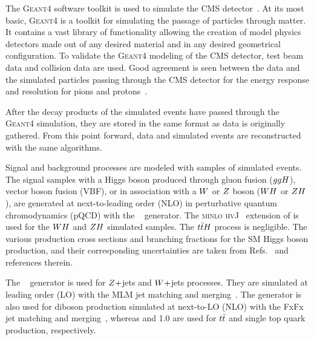 The \textsc{Geant4} software toolkit is used to simulate the CMS 
detector~\cite{Agostinelli:2002hh}. At its most basic, \textsc{Geant4} is a 
toolkit for simulating the passage of particles through matter. It contains a 
vast library of functionality allowing the creation of model physics detectors
made out of any desired material and in any desired geometrical configuration.
To validate the \textsc{Geant4} modeling of the CMS detector, test beam data and
collision data are used. Good agreement is seen between the data and the
simulated particles passing through the CMS detector for the energy response
and resolution for pions and protons~\cite{geant4_cms_2017}.

After the decay products of the simulated events have passed through the \textsc{Geant4}
simulation, they are stored in the same format as data is originally gathered. From
this point forward, data and simulated events are reconstructed with the same 
algorithms.




Signal and background processes are modeled with samples of simulated events.
The signal samples with a Higgs boson produced through gluon fusion ($ggH$), vector boson fusion (VBF),
or in association with a $W$ or $Z$ boson ($WH$ or $ZH$), are generated at next-to-leading order (NLO) in perturbative quantum chromodynamics (pQCD) with the ~\cite{Nason:2004rx,Frixione:2007vw, Alioli:2010xd, Alioli:2010xa, Alioli:2008tz} generator. The \textsc{minlo hvJ}~\cite{Luisoni:2013kna} extension of  is used for the $WH$ and $ZH$ simulated samples. 
The $t\bar{t}H$ process is negligible.
The various production cross sections and branching fractions for the SM Higgs boson production, and their corresponding uncertainties are taken from Refs.~\cite{deFlorian:2016spz,Denner:2011mq,Ball:2011mu} and references therein.

The \aMCATNLO~\cite{Alwall:2014hca} generator is used for $Z+$jets and $W+$jets processes. They are simulated at leading order (LO) with the MLM jet matching and merging~\cite{Alwall:2007fs}.
The \aMCATNLO generator is also used for diboson production simulated at next-to-LO (NLO) with the FxFx jet matching and merging~\cite{Frederix:2012ps}, whereas  and 1.0 are used for $t\bar{t}$ and single top quark production, respectively.



